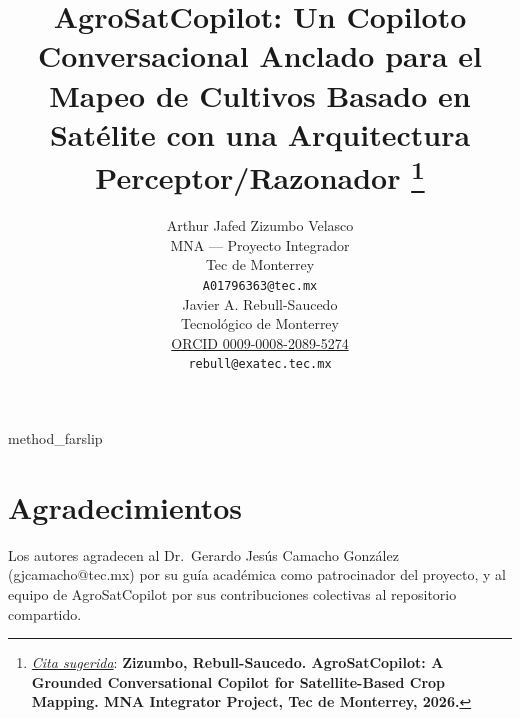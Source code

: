 \documentclass{article}
\title{AgroSatCopilot: Un Copiloto Conversacional Anclado para el Mapeo
de Cultivos Basado en Satélite con una Arquitectura Perceptor/Razonador
\thanks{\textit{\underline{Cita sugerida}}: \textbf{Zizumbo,
Rebull-Saucedo. AgroSatCopilot: A Grounded Conversational Copilot
for Satellite-Based Crop Mapping. MNA Integrator Project, Tec de
Monterrey, 2026.}}
}
\author{
  Arthur Jafed Zizumbo Velasco \\
  MNA --- Proyecto Integrador \\
  Tec de Monterrey \\
  \texttt{A01796363@tec.mx} \\
  \And
  Javier A. Rebull-Saucedo \\
  Tecnol\'ogico de Monterrey \\
  \href{https://orcid.org/0009-0008-2089-5274}{ORCID 0009-0008-2089-5274} \\
  \texttt{rebull@exatec.tec.mx} \\
}
\begin{document}
\maketitle








{method_farslip}


\label{sec:farslip_transfer}




\section*{Agradecimientos}
Los autores agradecen al Dr.\ Gerardo Jes\'us Camacho Gonz\'alez
(gjcamacho@tec.mx) por su gu\'ia acad\'emica como patrocinador del
proyecto, y al equipo de AgroSatCopilot por sus contribuciones
colectivas al repositorio compartido.





\end{document}
